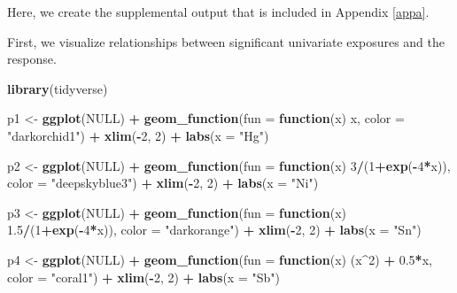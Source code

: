 \documentclass[12pt, twoside]{amherstthesis}
\newenvironment{Shaded}{\begin{snugshade}}{\end{snugshade}}
\newcommand{\AttributeTok}[1]{\textcolor[rgb]{0.13,0.29,0.53}{#1}}
\newcommand{\ConstantTok}[1]{\textcolor[rgb]{0.56,0.35,0.01}{#1}}
\newcommand{\ControlFlowTok}[1]{\textcolor[rgb]{0.13,0.29,0.53}{\textbf{#1}}}
\newcommand{\DecValTok}[1]{\textcolor[rgb]{0.00,0.00,0.81}{#1}}
\newcommand{\FloatTok}[1]{\textcolor[rgb]{0.00,0.00,0.81}{#1}}
\newcommand{\FunctionTok}[1]{\textcolor[rgb]{0.13,0.29,0.53}{\textbf{#1}}}
\newcommand{\NormalTok}[1]{#1}
\newcommand{\OtherTok}[1]{\textcolor[rgb]{0.56,0.35,0.01}{#1}}
\newcommand{\SpecialCharTok}[1]{\textcolor[rgb]{0.81,0.36,0.00}{\textbf{#1}}}
\newcommand{\StringTok}[1]{\textcolor[rgb]{0.31,0.60,0.02}{#1}}
\begin{document}
Here, we create the supplemental output that is included in Appendix \ref{appa}.

First, we visualize relationships between significant univariate exposures and the response.

\scriptsize
\begin{Shaded}
\begin{Highlighting}[]
\FunctionTok{library}\NormalTok{(tidyverse)}

\NormalTok{p1 }\OtherTok{\textless{}{-}} \FunctionTok{ggplot}\NormalTok{(}\ConstantTok{NULL}\NormalTok{) }\SpecialCharTok{+}
  \FunctionTok{geom\_function}\NormalTok{(}\AttributeTok{fun =} \ControlFlowTok{function}\NormalTok{(x) x, }
                \AttributeTok{color =} \StringTok{"darkorchid1"}\NormalTok{) }\SpecialCharTok{+}
  \FunctionTok{xlim}\NormalTok{(}\SpecialCharTok{{-}}\DecValTok{2}\NormalTok{, }\DecValTok{2}\NormalTok{) }\SpecialCharTok{+}
  \FunctionTok{labs}\NormalTok{(}\AttributeTok{x =} \StringTok{"Hg"}\NormalTok{)}

\NormalTok{p2 }\OtherTok{\textless{}{-}} \FunctionTok{ggplot}\NormalTok{(}\ConstantTok{NULL}\NormalTok{) }\SpecialCharTok{+}
  \FunctionTok{geom\_function}\NormalTok{(}\AttributeTok{fun =} \ControlFlowTok{function}\NormalTok{(x) }\DecValTok{3}\SpecialCharTok{/}\NormalTok{(}\DecValTok{1}\SpecialCharTok{+}\FunctionTok{exp}\NormalTok{(}\SpecialCharTok{{-}}\DecValTok{4}\SpecialCharTok{*}\NormalTok{x)), }
                \AttributeTok{color =} \StringTok{"deepskyblue3"}\NormalTok{) }\SpecialCharTok{+}
  \FunctionTok{xlim}\NormalTok{(}\SpecialCharTok{{-}}\DecValTok{2}\NormalTok{, }\DecValTok{2}\NormalTok{) }\SpecialCharTok{+}
  \FunctionTok{labs}\NormalTok{(}\AttributeTok{x =} \StringTok{"Ni"}\NormalTok{)}

\NormalTok{p3 }\OtherTok{\textless{}{-}} \FunctionTok{ggplot}\NormalTok{(}\ConstantTok{NULL}\NormalTok{) }\SpecialCharTok{+}
  \FunctionTok{geom\_function}\NormalTok{(}\AttributeTok{fun =} \ControlFlowTok{function}\NormalTok{(x) }\FloatTok{1.5}\SpecialCharTok{/}\NormalTok{(}\DecValTok{1}\SpecialCharTok{+}\FunctionTok{exp}\NormalTok{(}\SpecialCharTok{{-}}\DecValTok{4}\SpecialCharTok{*}\NormalTok{x)), }
                \AttributeTok{color =} \StringTok{"darkorange"}\NormalTok{) }\SpecialCharTok{+}
  \FunctionTok{xlim}\NormalTok{(}\SpecialCharTok{{-}}\DecValTok{2}\NormalTok{, }\DecValTok{2}\NormalTok{) }\SpecialCharTok{+}
  \FunctionTok{labs}\NormalTok{(}\AttributeTok{x =} \StringTok{"Sn"}\NormalTok{)}

\NormalTok{p4 }\OtherTok{\textless{}{-}} \FunctionTok{ggplot}\NormalTok{(}\ConstantTok{NULL}\NormalTok{) }\SpecialCharTok{+}
  \FunctionTok{geom\_function}\NormalTok{(}\AttributeTok{fun =} \ControlFlowTok{function}\NormalTok{(x) (x}\SpecialCharTok{\^{}}\DecValTok{2}\NormalTok{) }\SpecialCharTok{+} \FloatTok{0.5}\SpecialCharTok{*}\NormalTok{x, }
                \AttributeTok{color =} \StringTok{"coral1"}\NormalTok{) }\SpecialCharTok{+}
  \FunctionTok{xlim}\NormalTok{(}\SpecialCharTok{{-}}\DecValTok{2}\NormalTok{, }\DecValTok{2}\NormalTok{) }\SpecialCharTok{+}
  \FunctionTok{labs}\NormalTok{(}\AttributeTok{x =} \StringTok{"Sb"}\NormalTok{)}


\end{Highlighting}
\end{Shaded}
\end{document}
